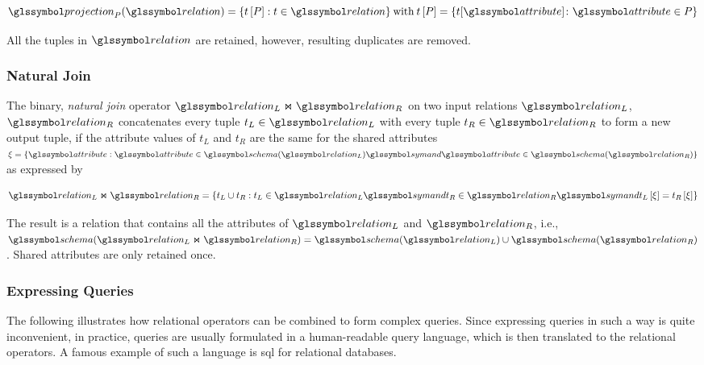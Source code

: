 \begin{equation}
    \label{equation:rel_op_projection}
    \projection_{P}(\relation) = \{ t\left[ P \right] : t \in \relation \} \: \textrm{with} \: t\left[ P \right] = \{ t[\attribute] \colon \attribute \in P \}
\end{equation}

All the tuples in $\relation$ are retained, however, resulting duplicates are removed.

\subsubsection{Natural Join}

The binary, \emph{natural join} operator $\relation_L \Join \relation_R$ on two input relations $\relation_L$, $\relation_R$ concatenates every tuple $t_{L} \in \relation_L$ with every tuple $t_{R} \in \relation_R$ to form a new output tuple, if the attribute values of $t_{L}$ and $t_{R}$ are the same for the shared attributes $\xi = \{ \attribute : \attribute \in \schema(\relation_L) \symand \attribute \in \schema(\relation_R) \}$ as expressed by 

\begin{equation}
    \label{equation:rel_op_join}
    \relation_L \Join \relation_R = \{ t_L \cup t_R : t_L \in \relation_L \symand t_R \in \relation_R \symand t_L\left[ \xi \right] = t_R\left[ \xi \right] \}
\end{equation}

The result is a relation that contains all the attributes of $\relation_L$ and $\relation_R$, i.e., $\schema(\relation_L \Join \relation_R) = \schema(\relation_L) \cup \schema(\relation_R)$. Shared attributes are only retained once.

\subsubsection{Expressing Queries}

The following  illustrates how relational operators can be combined to form complex queries. Since expressing queries in such a way is quite inconvenient, in practice, queries are usually formulated in a human-readable query language, which is then translated to the relational operators. A famous example of such a language is \acrshort{sql} \cite{Chamberlin:2012Early} for relational databases.


